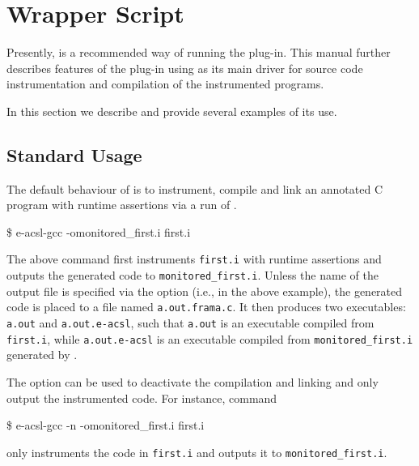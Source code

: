 \section{\eacsl Wrapper Script} %
\label{sec:wrapper}

\begin{important}
  Presently, \eacslgcc is a recommended way of running the \eacsl plug-in.
  This manual further describes features of the \eacsl plug-in using \eacslgcc
  as its main driver for source code instrumentation and compilation of the
  instrumented programs.
\end{important}

In this section we describe \eacslgcc and provide several examples of its use.

\subsection{Standard Usage}

The default behaviour of \eacslgcc is to instrument, compile and link an
annotated C program with runtime assertions via a run of \framac.

\begin{frama-c-commands}
\$ e-acsl-gcc -omonitored_first.i first.i
\end{frama-c-commands}

The above command first instruments \texttt{first.i} with runtime assertions and
outputs the generated code to \texttt{monitored\_first.i}. Unless the name of
the output file is specified via the  option (i.e.,
 in the above example), the generated
code is placed to a file named \texttt{a.out.frama.c}. It then produces two
executables: \texttt{a.out} and \texttt{a.out.e-acsl}, such that \texttt{a.out}
is an executable compiled from \texttt{first.i}, while \texttt{a.out.e-acsl} is
an executable compiled from \texttt{monitored\_first.i} generated by \eacsl.

The  option can be used to deactivate the compilation and linking
and only output the instrumented code. For instance, command

\begin{frama-c-commands}
\$ e-acsl-gcc -n -omonitored_first.i first.i
\end{frama-c-commands}

only instruments the code in \texttt{first.i} and outputs it to
\texttt{monitored\_first.i}.

